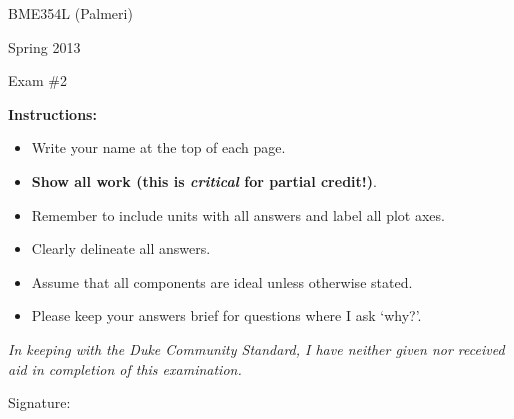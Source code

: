 

\vspace*{0.5in}

\centerline{\LARGE BME354L (Palmeri)}
\vspace*{0.25in}
\centerline{\LARGE Spring 2013}
\vspace*{0.25in}
\centerline{\LARGE Exam \#2}
\vspace*{0.25in}

{\bf Instructions:} 
\begin{itemize}
\item Write your name at the top of each page.
\item {\bf Show all work (this is {\it critical} for partial credit!)}.
\item Remember to include units with all answers and label all plot axes.
\item Clearly delineate all answers.
\item Assume that all components are ideal unless otherwise stated.
\item Please keep your answers brief for questions where I ask `why?'.
\end{itemize}

\vspace*{3in}

\emph{In keeping with the Duke Community Standard, I have neither given nor received aid in completion of this examination.}

\vspace*{0.5in}

Signature:\underline{\hspace*{3.0in}}

